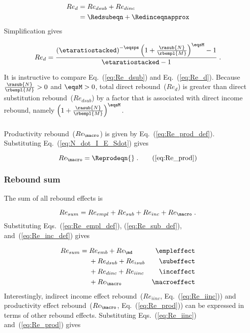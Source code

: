 \begin{align} 
  Re_d &= Re_{dsub} + Re_{dinc} \nonumber \\
       &= \Redsubeqn + \Redinceqnapprox
\end{align}
%
Simplification gives

\begin{equation} \label{eq:Re_d}
  Re_d = \frac{ \left( \etaratiostacked \right)^{-\eqsps}
             \left( 1 + \frac{\rasub{N}}{\rbempl{M}} \right)^{\eqsM}   - 1}
         {\etaratiostacked - 1} \; .
\end{equation}

It is instructive to compare Eq.~(\ref{eq:Re_dsub}) and Eq.~(\ref{eq:Re_d}).
Because 
$\frac{\rasub{N}}{\rbempl{M}} > 0$ and 
$\eqsM > 0$,
total direct rebound~($Re_d$) is greater than 
direct substitution rebound~($Re_{dsub}$) by a factor
that is associated with direct income rebound, namely
$\left( 1 + \frac{\rasub{N}}{\rbempl{M}} \right)^{\eqsM}$.


\subsubsection{\Prodeffect{}} 
\label{sec:Re_prod}

Productivity rebound~($Re_{\macro}$) is given by Eq.~(\ref{eq:Re_prod_def}).
Substituting Eq.~(\ref{eq:N_dot_I_E_Sdot}) gives

\begin{equation}
  Re_{\macro} = \Reprodeqn{} \; . \tag{\ref{eq:Re_prod}}
\end{equation}


\subsubsection{Rebound sum} 
\label{sec:total_rebound}

The sum of all rebound effects is 

\begin{equation}
  Re_{sum} = Re_{empl} + Re_{sub} + Re_{inc} + Re_{\macro} \; .
\end{equation}
%
Substituting Eqs.~(\ref{eq:Re_empl_def}), (\ref{eq:Re_sub_def}), and~(\ref{eq:Re_inc_def}) gives

\begin{align}
  Re_{sum} = \; &Re_{emb} + Re_{\md}      & \mathrm{\empleffect} \nonumber \\
                &+ Re_{dsub} + Re_{isub}   & \mathrm{\subeffect}  \nonumber \\
                &+ Re_{dinc} + Re_{iinc}   & \mathrm{\inceffect}  \nonumber \\
                &+ Re_{\macro}               & \mathrm{\macroeffect}
\end{align}
%
Interestingly, 
indirect income effect rebound~($Re_{iinc}$, Eq.~(\ref{eq:Re_iinc})) and
productivity effect rebound~($Re_{\macro}$, Eq.~(\ref{eq:Re_prod}))
can be expressed in terms of other rebound effects.
Substituting Eqs.~(\ref{eq:Re_iinc}) and~(\ref{eq:Re_prod}) gives


